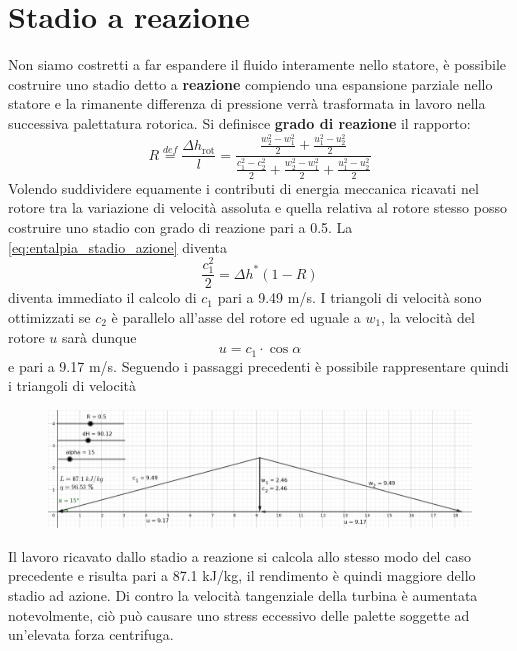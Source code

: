 \documentclass[a4paper,12pt]{article}
\begin{document}
\section{Stadio a reazione}
\label{sec:stadio_a_reazione}
Non siamo costretti a far espandere il fluido interamente nello statore, è possibile costruire uno stadio detto a \textbf{reazione} compiendo una espansione parziale
nello statore e la rimanente differenza di pressione verrà trasformata in lavoro nella successiva palettatura rotorica.
Si definisce \textbf{grado di reazione} il rapporto:
\begin{equation}
    \label{eq:grado_di_reazione}
    R \stackrel{def}{=} \frac{\Delta h_{\text{rot}}}{l} = \frac{\frac{w_2^2-w_1^2}{2} + \frac{u_1^2 - u_2^2}{2} }  %
                                                                {\frac{c_1^2-c_2^2}{2} + \frac{w_2^2-w_1^2}{2} + \frac{u_1^2 - u_2^2}{2}}  %
\end{equation}
Volendo suddividere equamente i contributi di energia meccanica ricavati nel rotore tra la variazione di velocità assoluta e quella relativa al rotore stesso
posso costruire uno stadio con grado di reazione pari a 0.5.
La \eqref{eq:entalpia_stadio_azione} diventa
\begin{equation}
    \frac{c_1^2}{2} = \Delta h^* (1-R)
\end{equation}
diventa immediato il calcolo di $c_1$ pari a 9.49 m/s.
I triangoli di velocità sono ottimizzati se $c_2$ è parallelo all'asse del rotore ed uguale a $w_1$, la velocità del rotore $u$ sarà dunque
\begin{equation}
    u = c_1 \cdot \cos \alpha
\end{equation}
e pari a 9.17 m/s.
Seguendo i passaggi precedenti è possibile rappresentare quindi i triangoli di velocità
\begin{figure}[H]
    \label{fig:triangoli_reazione}
    \centering
    \includegraphics[width=\linewidth]{media/triangoli_reazione.png}
\end{figure}
Il lavoro ricavato dallo stadio a reazione si calcola allo stesso modo del caso precedente e risulta pari a 87.1 kJ/kg, il rendimento è quindi maggiore dello stadio
ad azione. Di contro la velocità tangenziale della turbina è aumentata notevolmente, ciò può causare uno stress eccessivo delle palette soggette ad un'elevata
forza centrifuga.
\end{document}
